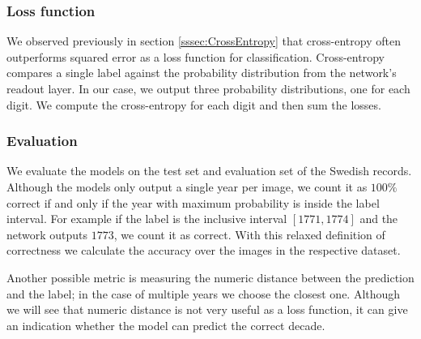 


\subsubsection{Loss function}

We observed previously in section \ref{sssec:CrossEntropy} that cross-entropy often outperforms squared error as a loss function for classification. Cross-entropy compares a single label against the probability distribution from the network's readout layer. In our case, we output three probability distributions, one for each digit.
We compute
the cross-entropy for each digit and then sum the losses.

\subsubsection{Evaluation}

We evaluate the models on the test set and evaluation set of the Swedish records. Although the models only output a single year per image, we count it as $100\%$ correct if and only if the year with maximum probability is inside the label interval. For example if the label is the inclusive interval $[1771, 1774]$ and the network outputs $1773$, we count it as correct. With this relaxed definition of correctness we calculate the accuracy over the images in the respective dataset.

Another possible metric is measuring the numeric distance between the prediction and the label; in the case of multiple years we choose the closest one. Although we will see that numeric distance is not very useful as a loss function, it can give an indication whether the model can predict the correct decade.



